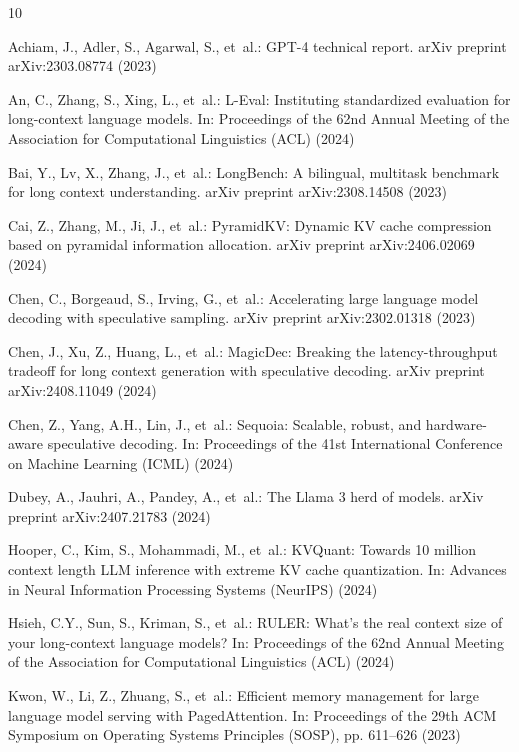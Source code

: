 \documentclass[runningheads]{llncs}
\begin{document}

\begin{thebibliography}{10}

Achiam, J., Adler, S., Agarwal, S., et~al.:
GPT-4 technical report.
arXiv preprint arXiv:2303.08774 (2023)

An, C., Zhang, S., Xing, L., et~al.:
L-Eval: Instituting standardized evaluation for long-context language models.
In: Proceedings of the 62nd Annual Meeting of the Association for Computational Linguistics (ACL) (2024)

Bai, Y., Lv, X., Zhang, J., et~al.:
LongBench: A bilingual, multitask benchmark for long context understanding.
arXiv preprint arXiv:2308.14508 (2023)

Cai, Z., Zhang, M., Ji, J., et~al.:
PyramidKV: Dynamic KV cache compression based on pyramidal information allocation.
arXiv preprint arXiv:2406.02069 (2024)

Chen, C., Borgeaud, S., Irving, G., et~al.:
Accelerating large language model decoding with speculative sampling.
arXiv preprint arXiv:2302.01318 (2023)

Chen, J., Xu, Z., Huang, L., et~al.:
MagicDec: Breaking the latency-throughput tradeoff for long context generation with speculative decoding.
arXiv preprint arXiv:2408.11049 (2024)

Chen, Z., Yang, A.H., Lin, J., et~al.:
Sequoia: Scalable, robust, and hardware-aware speculative decoding.
In: Proceedings of the 41st International Conference on Machine Learning (ICML) (2024)

Dubey, A., Jauhri, A., Pandey, A., et~al.:
The Llama 3 herd of models.
arXiv preprint arXiv:2407.21783 (2024)

Hooper, C., Kim, S., Mohammadi, M., et~al.:
KVQuant: Towards 10 million context length LLM inference with extreme KV cache quantization.
In: Advances in Neural Information Processing Systems (NeurIPS) (2024)

Hsieh, C.Y., Sun, S., Kriman, S., et~al.:
RULER: What's the real context size of your long-context language models?
In: Proceedings of the 62nd Annual Meeting of the Association for Computational Linguistics (ACL) (2024)

Kwon, W., Li, Z., Zhuang, S., et~al.:
Efficient memory management for large language model serving with PagedAttention.
In: Proceedings of the 29th ACM Symposium on Operating Systems Principles (SOSP), pp. 611--626 (2023)


\end{thebibliography}
\end{document}
